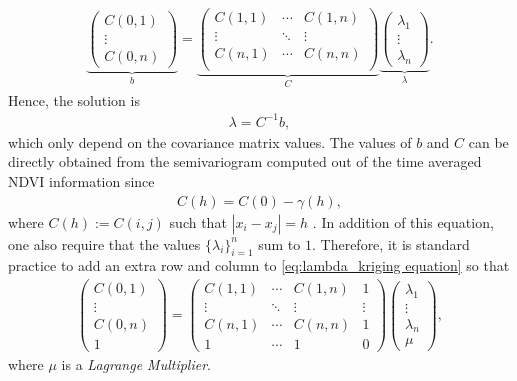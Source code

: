 \documentclass[10pt,letterpaper,conference]{ieeeconf}
\begin{document}
\begin{align*}
 \underbrace{\left(\begin{array}{c} C(0,1)\\ \vdots \\ C(0,n) 
\end{array}\right)}_{\displaystyle b} = \underbrace{\left(\begin{array}{ccc} 
C(1,1) & \cdots & C(1,n) \\ \vdots & \ddots & \vdots \\ C(n,1) & \cdots & C(n,n) 
\\ \end{array}\right)}_{\displaystyle C} \underbrace{\left(\begin{array}{c} 
\lambda_1\\ \vdots \\ \lambda_n \end{array}\right)}_{\displaystyle \lambda}.
\end{align*}
Hence, the solution is
\begin{align} \label{eq:lambda_kriging equation}
\lambda= C^{-1}b,  
\end{align}
which only depend on the covariance matrix values. The values of $b$ and $C$ 
can be directly obtained from the semivariogram computed out of the time 
averaged NDVI information since 
\begin{align*}
C(h) = C(0) - \gamma(h), 
\end{align*}
where $C(h) := C(i,j)$ such that $|x_i-x_j|=h$ \cite{Cressie_91}. In addition 
of this equation, one also require that the values $\{\lambda_i\}_{i=1}^n$ 
sum to $1$. Therefore, it is standard practice to add an extra row  and column 
to 
\eqref{eq:lambda_kriging equation} so that 
\begin{align*}
\left(\begin{array}{c} C(0,1)\\ \vdots \\ C(0,n) \\1
\end{array}\right) = \left(\begin{array}{cccc} 
C(1,1) & \cdots & C(1,n) & 1 \\ \vdots & \ddots & \vdots & \vdots \\ C(n,1) & 
\cdots & C(n,n) & 1 \\ 1 & \cdots & 1 & 0  \end{array}\right) 
\left(\begin{array}{c} 
\lambda_1\\ \vdots \\ \lambda_n \\ \mu \end{array}\right),
\end{align*}
where $\mu$ is a \emph{Lagrange Multiplier}.
\end{document}
